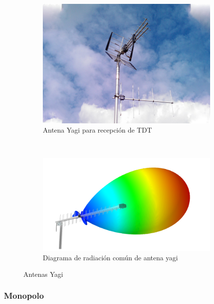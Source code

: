\begin{figure}[h]
\centering
	\begin{subfigure}[b]{0.45\textwidth}
    \centering
        \includegraphics[width=\textwidth]{archivos/dipolo/yagi}
        \caption{Antena Yagi para recepción de TDT \cite{Pearce2010}}
        \label{fig:yagi}
	\end{subfigure}
~ %
	\begin{subfigure}[b]{0.45\textwidth} %
	\centering
		\includegraphics[width=\textwidth]{archivos/yagipat} %
		\caption{Diagrama de radiación común de antena yagi}
		\label{fig:yagirad}
	\end{subfigure}
\caption{Antenas Yagi}\label{fig:yagis}
\end{figure}

\subsubsection{Monopolo}

